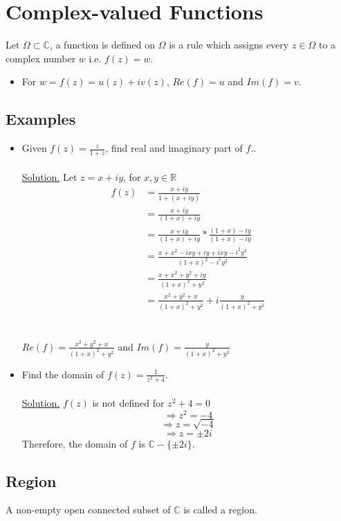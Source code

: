 \documentclass{article}
\begin{document}
\section{Complex-valued Functions}
Let $\Omega \subset \mathbb{C}$, a function is defined on $\Omega$ is a rule which assigns every $z \in \Omega$ to a complex number $w$ i.e. $f(z)=w$.
\begin{itemize}
    \item For $w=f(z)=u(z)+iv(z)$, $Re(f)=u$ and $Im(f)=v$.
\end{itemize}
\subsection{Examples}
\begin{itemize}
    \item Given $f(z)=\frac{z}{1+z}$, find real and imaginary part of $f$..
    \\
    \\
    \underline{Solution.} Let $z=x+iy$, for $x,y \in \mathbb{R}$
    \\
    \begin{align}
        f(z) &= \frac{x+iy}{1+(x+iy)} \\
        &=\frac{x+iy}{(1+x)+iy} \\
        &=\frac{x+iy}{(1+x)+iy}* \frac{(1+x)-iy}{(1+x)-iy} \\
        &=\frac{x+x^2-ixy+iy+ixy-i^2y^2}{(1+x)^2-i^2y^2} \\
        &=\frac{x+x^2+y^2+iy}{(1+x)^2+y^2} \\
        &=\frac{x^2+y^2+x}{(1+x)^2+y^2}+i \frac{y}{(1+x)^2+y^2}
    \end{align}
    \\
    \\
    $Re(f)=\frac{x^2+y^2+x}{(1+x)^2+y^2}$ and $Im(f)=\frac{y}{(1+x)^2+y^2}$
    
    
    \item Find the domain of $f(z)=\frac{1}{z^2+4}$.
    \\
    \\
    \underline{Solution.} $f(z)$ is not defined for $z^2+4=0$
\[     \Rightarrow z^2=-4     \] \[     \Rightarrow z=\sqrt{-4}     \] \[     \Rightarrow z=\pm 2i     \] Therefore, the domain of $f$ is $\mathbb{C}-\{\pm2i\}$.
\end{itemize}
\subsection{Region}
A non-empty open connected subset of $\mathbb{C}$ is called a region.
\end{document}
